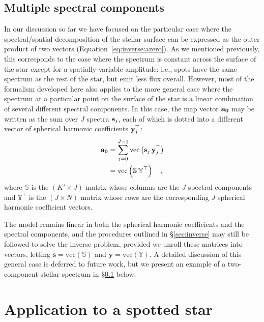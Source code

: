 \documentclass[modern]{aastex631}
\begin{document}
\subsection{Multiple spectral components}
\label{sec:eigen}
%
In our discussion so far we have focused on the particular case where the spectral/spatial decomposition of the stellar surface can be expressed as the outer product of two vectors (Equation~\ref{eq:inverse:azero}). 
As we mentioned previously, this corresponds to the case where the spectrum is constant across the surface of the star except for a spatially-variable amplitude: i.e., spots have the same spectrum as the rest of the star, but emit less flux overall. 
However, most of the formalism developed here also applies to the more general case where the spectrum at a particular point on the surface of the star is a linear combination of several different spectral components. 
In this case, the map vector ${\mathbf{a_0}}$ may be written as the sum over $J$ spectra ${\mathbf{s}}_j$, each of which is dotted into a different vector of spherical harmonic coefficients ${\mathbf{y}}_j^\top$:
%
\begin{align}
    \label{eq:eigen:azero}
    {\ensuremath{\mathbf{a_0}}}
     & =
    \sum_{j=0}^{J-1}\mathrm{vec}\left( {\mathbf{s}}_j \, {\mathbf{y}}_j^\top \right) \\
     & =
    \mathrm{vec}\left( \boldsymbol{\mathbb{S}} \, \boldsymbol{\mathbb{Y}}^\top \right) \quad,
\end{align}
%
where $\boldsymbol{\mathbb{S}}$ is the $(K' \times J)$ matrix whose columns are the $J$ spectral components and $\boldsymbol{\mathbb{Y}}^\top$ is the $(J \times N)$ matrix whose rows are the corresponding $J$ spherical harmonic coefficient vectors.

The model remains linear in both the spherical harmonic coefficients and the spectral components, and the procedures outlined in \S\ref{sec:inverse} may still be followed to solve the inverse problem, provided we unroll these matrices into vectors, letting $\mathbf{s} = \mathrm{vec}(\boldsymbol{\mathbb{S}})$ and $\mathbf{y} = \mathrm{vec}(\boldsymbol{\mathbb{Y}})$.
A detailed discussion of this general case is deferred to future work, but we present an example of a two-component stellar spectrum in \S\ref{sec:eigen}
below.

\section{Application to a spotted star}
\label{sec:spotstar}
\end{document}
